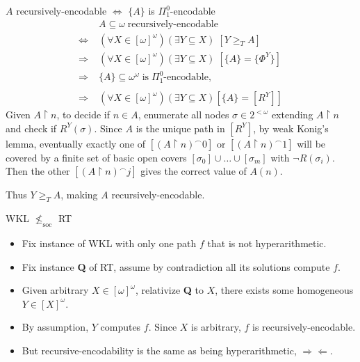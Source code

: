 \begin{frame}{$A$ recursively-encodable $\Leftrightarrow$
$\{A\}$ is $\Pi_1^0$-encodable}
  \begin{align*}
    \;&A\subseteq\omega\; \text{recursively-encodable}\\
    \Leftrightarrow\; & (\forall X\in[\omega]^\omega)(\exists Y\subseteq
      X)\; [Y\geq_T A]\\
    \Rightarrow\; & (\forall X\in[\omega]^\omega)(\exists Y\subseteq X)\;
      [\{A\}=\{\Phi^Y\}]\\
    \Rightarrow\; &\{A\}\subseteq\omega^\omega\; \text{is}\;
      \Pi_1^0\text{-encodable},\\
    &\\
    \Rightarrow\; & (\forall X\in[\omega]^\omega)(\exists Y\subseteq
      X) [\{A\}=[R^Y]]
  \end{align*}
  Given $A\restriction n$, to decide if $n\in A$, enumerate all nodes
  $\sigma\in2^{<\omega}$ extending $A\restriction n$ and check if
  $R^Y(\sigma)$. Since $A$ is the unique path in $[R^Y]$, by weak Konig's
  lemma, eventually exactly one of $[(A\restriction n)^\frown 0]$ or
  $[(A\restriction n)^\frown 1]$ will be covered by a finite set of basic
  open covers $[\sigma_0]\cup\ldots\cup[\sigma_m]$ with $\neg R(\sigma_i)$.
  Then the other $[(A\restriction n)^\frown j]$ gives the correct value
  of $A(n)$.
  \vspace{0.5em}

  Thus $Y\geq_TA$, making $A$ recursively-encodable.
\end{frame}

\begin{frame}{WKL $\nleq_{\text{soc}}$ RT}
  \begin{itemize}
    \item Fix instance of WKL with only one path $f$ that is
      not hyperarithmetic.
    \item Fix instance \textbf{Q} of RT, assume by contradiction all
      its solutions compute $f$.
    \item Given arbitrary $X\in[\omega]^\omega$, relativize \textbf{Q} to
      $X$, there exists some homogeneous $Y\in[X]^\omega$.
    \item By assumption, $Y$ computes $f$. Since $X$ is arbitrary, $f$ is
      recursively-encodable.
    \item But recursive-encodability is the same as being
      hyperarithmetic, $\Rightarrow\Leftarrow$.
  \end{itemize}
\end{frame}
